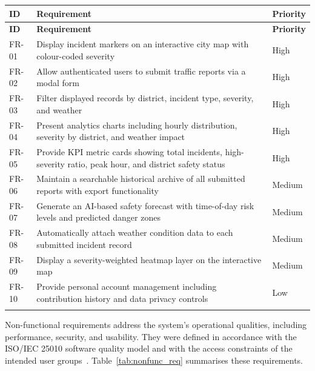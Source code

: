 \documentclass[12pt,a4paper]{report}
\begin{document}
\begin{tabularx}{\textwidth}{|>{\centering\arraybackslash}p{1.5cm}
                  |>{\raggedright\arraybackslash}X
                  |>{\centering\arraybackslash}p{1.9cm}|}

\hline
\textbf{ID} & \textbf{Requirement} & \textbf{Priority} \\
\hline
\endfirsthead

\hline
\textbf{ID} & \textbf{Requirement} & \textbf{Priority} \\
\hline
\endhead

FR-01 & Display incident markers on an interactive city map with colour-coded severity & High \\
\hline
FR-02 & Allow authenticated users to submit traffic reports via a modal form & High \\
\hline
FR-03 & Filter displayed records by district, incident type, severity, and weather & High \\
\hline
FR-04 & Present analytics charts including hourly distribution, severity by district, and weather impact & High \\
\hline
FR-05 & Provide KPI metric cards showing total incidents, high-severity ratio, peak hour, and district safety status & High \\
\hline
FR-06 & Maintain a searchable historical archive of all submitted reports with export functionality & Medium \\
\hline
FR-07 & Generate an AI-based safety forecast with time-of-day risk levels and predicted danger zones & Medium \\
\hline
FR-08 & Automatically attach weather condition data to each submitted incident record & Medium \\
\hline
FR-09 & Display a severity-weighted heatmap layer on the interactive map & Medium \\
\hline
FR-10 & Provide personal account management including contribution history and data privacy controls & Low \\
\hline

\caption{\centering Functional requirements of the AstanaSafe dashboard} \label{tab:func_req} \\

\end{tabularx}


Non-functional requirements address the system's operational qualities, including performance, security, and usability. They were defined in accordance with the ISO/IEC 25010 software quality model and with the access constraints of the intended user groups~\cite{iso25010}. Table~\ref{tab:nonfunc_req} summarises these requirements.
\end{document}
